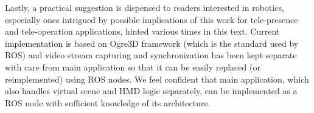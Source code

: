 Lastly, a practical suggestion is dispensed to readers interested in robotics, especially ones intrigued by possible implications of this work for tele-presence and tele-operation applications, hinted various times in this text. Current implementation is based on Ogre3D framework (which is the standard used by ROS) and video stream capturing and synchronization has been kept separate with care from main application so that it can be easily replaced (or reimplemented) using ROS nodes. We feel confident that main application, which also handles virtual scene and HMD logic separately, can be implemented as a ROS node with sufficient knowledge of its architecture.

\iffalse
\section{Performance and experience optimizations}

\subsection{Employing ultra-wide Fish-eye lenses}
Increased percieved FOV \\
Decouple from camera FPS\\

\subsection{Low FPS: decreasing image resolution}

\subsection{Undistort and marker detection in CUDA}

\subsection{"Mono" mode}

\subsection{Virtual nose}

\section{Further development}

\subsection{Depth mapping with CUDA, stereo computer vision or depth sensor}

\subsection{Enhancing interactions with virtual hands with Leap Motion}

\subsection{Integration with ROS}
\fi